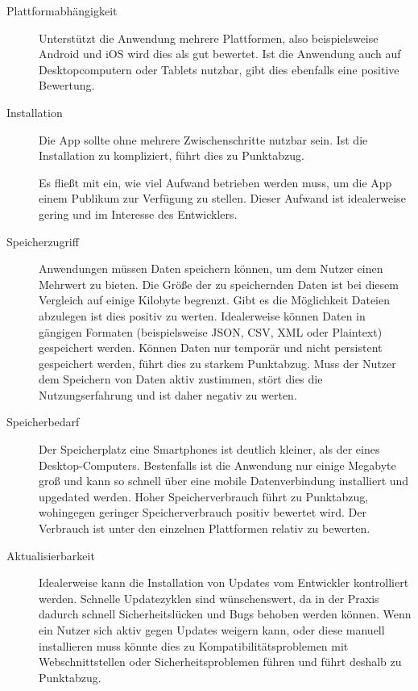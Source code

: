 \begin{description}
	\item [Plattformabhängigkeit] 
		  Unterstützt die Anwendung mehrere Plattformen, also beispielsweise Android und iOS wird dies als gut bewertet. Ist die Anwendung auch auf Desktopcomputern oder Tablets nutzbar, gibt dies ebenfalls eine positive Bewertung.
		  
	\item [Installation]
	      Die App sollte ohne mehrere Zwischenschritte nutzbar sein. Ist die Installation zu kompliziert, führt dies zu Punktabzug.

	      Es fließt mit ein, wie viel Aufwand betrieben werden muss, um die App einem Publikum zur Verfügung zu stellen. Dieser Aufwand ist idealerweise gering und im Interesse des Entwicklers.

	\item [Speicherzugriff]
	      Anwendungen müssen Daten speichern können, um dem Nutzer einen Mehrwert zu bieten. Die Größe der zu speichernden Daten ist bei diesem Vergleich auf einige Kilobyte begrenzt. Gibt es die Möglichkeit Dateien abzulegen ist dies positiv zu werten. Idealerweise können Daten in gängigen Formaten (beispielsweise JSON, CSV, XML oder Plaintext) gespeichert werden.
	      Können Daten nur temporär und nicht persistent gespeichert werden, führt dies zu starkem Punktabzug. Muss der Nutzer dem Speichern von Daten aktiv zustimmen, stört dies die Nutzungserfahrung und ist daher negativ zu werten.

	\item [Speicherbedarf]
	      Der Speicherplatz eine Smartphones ist deutlich kleiner, als der eines Desktop-Computers. Bestenfalls ist die Anwendung nur einige Megabyte groß und kann so schnell über eine mobile Datenverbindung installiert und upgedated werden. \cite{AppleMaxAppSize} \cite{GoogleMaxAppSize}
	      Hoher Speicherverbrauch führt zu Punktabzug, wohingegen geringer Speicherverbrauch positiv bewertet wird. Der Verbrauch ist unter den einzelnen Plattformen relativ zu bewerten.

	\item [Aktualisierbarkeit]
	      Idealerweise kann die Installation von Updates vom Entwickler kontrolliert werden. Schnelle Updatezyklen sind wünschenswert, da in der Praxis dadurch schnell Sicherheitslücken und Bugs behoben werden können. Wenn ein Nutzer sich aktiv gegen Updates weigern kann, oder diese manuell installieren muss könnte dies zu Kompatibilitätsproblemen mit Webschnittstellen oder Sicherheitsproblemen führen und führt deshalb zu Punktabzug.


\end{description}
